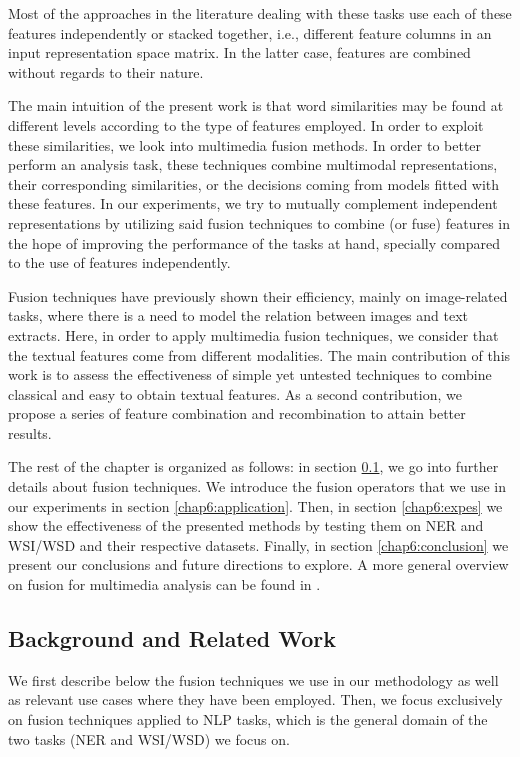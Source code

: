 Most of the approaches in the literature dealing with these tasks use each of these features independently or stacked together, i.e., different feature columns in an input representation space matrix. In the latter case, features are combined without regards to their nature. 

The main intuition of the present work is that word similarities may be found at different levels according to the type of features employed. In order to exploit these similarities, we look into multimedia fusion methods.  In order to better perform an analysis task, these techniques combine multimodal representations, their corresponding similarities, or the decisions coming from models fitted with these features. In our experiments, we try to mutually complement independent representations by utilizing said fusion techniques to combine (or fuse) features in the hope of improving the performance of the tasks at hand, specially compared to the use of features independently. 

Fusion techniques have previously shown their efficiency, mainly on image-related tasks, where there is a need to model the relation  between images and text extracts.
%
%
Here, in order to apply multimedia fusion techniques, we consider that the textual features  come from different modalities. The main contribution of this work is to assess the effectiveness of simple yet untested techniques to combine classical and easy to obtain textual features. As a second contribution, we propose a series of feature combination and recombination to attain better results. 

The rest of the chapter is organized as follows: in section \ref{chap6:back}, we go into further details about fusion techniques. 
We introduce the fusion operators that we use in our experiments in section \ref{chap6:application}. Then, in section \ref{chap6:expes} we show the effectiveness of the presented methods by testing them on NER and WSI/WSD and their respective datasets. Finally, in section \ref{chap6:conclusion} we present our conclusions and future directions to explore. A more general overview on fusion for multimedia analysis can be found in \cite{AtreyHEK10}.

\subsection{Background and Related Work}
\label{chap6:back}
 
We first describe below the fusion techniques we use in our methodology as well as relevant use cases where they have been employed. Then, we focus exclusively on fusion techniques applied to NLP tasks, which is the general domain of the two tasks (NER and WSI/WSD) we focus on.                                                                                                                 
